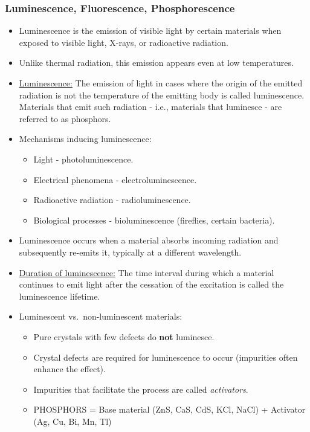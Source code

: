 \documentclass[t,aspectratio=169,xcolor=dvipsnames]{beamer}
\begin{document}
\begin{frame}
\frametitle{Luminescence, Fluorescence, Phosphorescence}
\begin{itemize}
\setlength{\parskip}{0pt}
\setlength{\itemsep}{0pt}
\item Luminescence is the emission of visible light by certain materials when exposed to visible light, X-rays, or radioactive radiation.
\item Unlike thermal radiation, this emission appears even at low temperatures.
\item \underline{Luminescence:} The emission of light in cases where the origin of the emitted radiation is not the temperature of the emitting body is called luminescence. Materials that emit such radiation - i.e., materials that luminesce - are referred to as phosphors.
\item Mechanisms inducing luminescence:
\begin{itemize}
\item Light - photoluminescence.
\item Electrical phenomena - electroluminescence.
\item Radioactive radiation - radioluminescence.
\item Biological processes - bioluminescence (fireflies, certain bacteria).
\end{itemize}
\item Luminescence occurs when a material absorbs incoming radiation and subsequently re-emits it, typically at a different wavelength.

\pagebreak
\item \underline{Duration of luminescence:} The time interval during which a material continues to emit light after the cessation of the excitation is called the luminescence lifetime.
\item Luminescent vs.\ non-luminescent materials:
\begin{itemize}
\item Pure crystals with few defects do \textbf{not} luminesce.
\item Crystal defects are required for luminescence to occur (impurities often enhance the effect).
\item Impurities that facilitate the process are called \textit{activators}.
\item PHOSPHORS = Base material (ZnS, CaS, CdS, KCl, NaCl) + Activator (Ag, Cu, Bi, Mn, Tl)
\end{itemize}


\end{itemize}
\end{frame}
\end{document}
